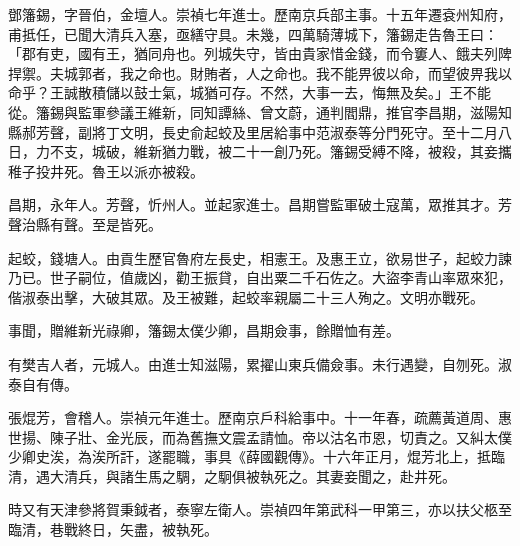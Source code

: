 \begin{pinyinscope}
鄧籓錫，字晉伯，金壇人。崇禎七年進士。歷南京兵部主事。十五年遷袞州知府，甫抵任，已聞大清兵入塞，亟繕守具。未幾，四萬騎薄城下，籓錫走告魯王曰：「郡有吏，國有王，猶同舟也。列城失守，皆由貴家惜金錢，而令窶人、餓夫列陴捍禦。夫城郭者，我之命也。財賄者，人之命也。我不能畀彼以命，而望彼畀我以命乎？王誠散積儲以鼓士氣，城猶可存。不然，大事一去，悔無及矣。」王不能從。籓錫與監軍參議王維新，同知譚絲、曾文蔚，通判閻鼎，推官李昌期，滋陽知縣郝芳聲，副將丁文明，長史俞起蛟及里居給事中范淑泰等分門死守。至十二月八日，力不支，城破，維新猶力戰，被二十一創乃死。籓錫受縛不降，被殺，其妾攜稚子投井死。魯王以派亦被殺。

昌期，永年人。芳聲，忻州人。並起家進士。昌期嘗監軍破土寇萬，眾推其才。芳聲治縣有聲。至是皆死。

起蛟，錢塘人。由貢生歷官魯府左長史，相憲王。及惠王立，欲易世子，起蛟力諫乃已。世子嗣位，值歲凶，勸王振貸，自出粟二千石佐之。大盜李青山率眾來犯，偕淑泰出擊，大破其眾。及王被難，起蛟率親屬二十三人殉之。文明亦戰死。

事聞，贈維新光祿卿，籓錫太僕少卿，昌期僉事，餘贈恤有差。

有樊吉人者，元城人。由進士知滋陽，累擢山東兵備僉事。未行遇變，自刎死。淑泰自有傳。

張焜芳，會稽人。崇禎元年進士。歷南京戶科給事中。十一年春，疏薦黃道周、惠世揚、陳子壯、金光辰，而為舊撫文震孟請恤。帝以沽名市恩，切責之。又糾太僕少卿史涘，為涘所訐，遂罷職，事具《薛國觀傳》。十六年正月，焜芳北上，抵臨清，遇大清兵，與諸生馬之騆，之駉俱被執死之。其妻妾聞之，赴井死。

時又有天津參將賀秉鉞者，泰寧左衛人。崇禎四年第武科一甲第三，亦以扶父柩至臨清，巷戰終日，矢盡，被執死。


\end{pinyinscope}
